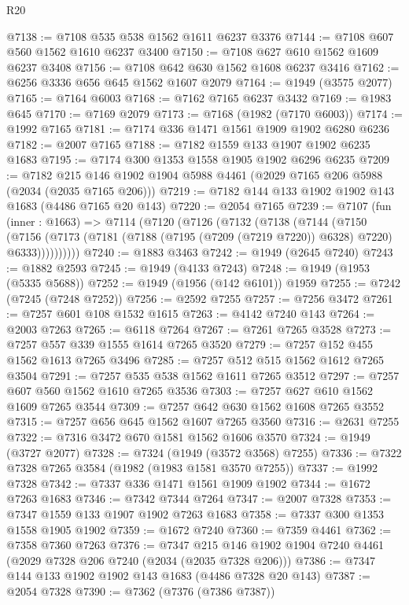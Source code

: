 \begin{lexlean}{R20}
\begin{coremodule}
@7138 := @7108 @535 @538 @1562 @1611 @6237 @3376
@7144 := @7108 @607 @560 @1562 @1610 @6237 @3400
@7150 := @7108 @627 @610 @1562 @1609 @6237 @3408
@7156 := @7108 @642 @630 @1562 @1608 @6237 @3416
@7162 := @6256 @3336 @656 @645 @1562 @1607 @2079
@7164 := @1949 (@3575 @2077)
@7165 := @7164 @6003
@7168 := @7162 @7165 @6237 @3432
@7169 := @1983 @645
@7170 := @7169 @2079
@7173 := @7168 (@1982 (@7170 @6003))
@7174 := @1992 @7165
@7181 := @7174 @336 @1471 @1561 @1909 @1902 @6280 @6236
@7182 := @2007 @7165
@7188 := @7182 @1559 @133 @1907 @1902 @6235 @1683
@7195 := @7174 @300 @1353 @1558 @1905 @1902 @6296 @6235
@7209 := @7182 @215 @146 @1902 @1904 @5988 @4461 (@2029 @7165 @206 @5988 (@2034 (@2035 @7165 @206)))
@7219 := @7182 @144 @133 @1902 @1902 @143 @1683 (@4486 @7165 @20 @143)
@7220 := @2054 @7165
@7239 := @7107
    (fun (inner : @1663) =>
    @7114
      (@7120
        (@7126
          (@7132
            (@7138
              (@7144
                (@7150
                  (@7156
                    (@7173 (@7181 (@7188 (@7195 (@7209 (@7219 @7220)) @6328) @7220) @6333))))))))))
@7240 := @1883 @3463
@7242 := @1949 (@2645 @7240)
@7243 := @1882 @2593
@7245 := @1949 (@4133 @7243)
@7248 := @1949 (@1953 (@5335 @5688))
@7252 := @1949 (@1956 (@142 @6101)) @1959
@7255 := @7242 (@7245 (@7248 @7252))
@7256 := @2592 @7255
@7257 := @7256 @3472
@7261 := @7257 @601 @108 @1532 @1615
@7263 := @4142 @7240 @143
@7264 := @2003 @7263
@7265 := @6118 @7264
@7267 := @7261 @7265 @3528
@7273 := @7257 @557 @339 @1555 @1614 @7265 @3520
@7279 := @7257 @152 @455 @1562 @1613 @7265 @3496
@7285 := @7257 @512 @515 @1562 @1612 @7265 @3504
@7291 := @7257 @535 @538 @1562 @1611 @7265 @3512
@7297 := @7257 @607 @560 @1562 @1610 @7265 @3536
@7303 := @7257 @627 @610 @1562 @1609 @7265 @3544
@7309 := @7257 @642 @630 @1562 @1608 @7265 @3552
@7315 := @7257 @656 @645 @1562 @1607 @7265 @3560
@7316 := @2631 @7255
@7322 := @7316 @3472 @670 @1581 @1562 @1606 @3570
@7324 := @1949 (@3727 @2077)
@7328 := @7324 (@1949 (@3572 @3568) @7255)
@7336 := @7322 @7328 @7265 @3584 (@1982 (@1983 @1581 @3570 @7255))
@7337 := @1992 @7328
@7342 := @7337 @336 @1471 @1561 @1909 @1902
@7344 := @1672 @7263 @1683
@7346 := @7342 @7344 @7264
@7347 := @2007 @7328
@7353 := @7347 @1559 @133 @1907 @1902 @7263 @1683
@7358 := @7337 @300 @1353 @1558 @1905 @1902
@7359 := @1672 @7240
@7360 := @7359 @4461
@7362 := @7358 @7360 @7263
@7376 := @7347 @215 @146 @1902 @1904 @7240 @4461 (@2029 @7328 @206 @7240 (@2034 (@2035 @7328 @206)))
@7386 := @7347 @144 @133 @1902 @1902 @143 @1683 (@4486 @7328 @20 @143)
@7387 := @2054 @7328
@7390 := @7362 (@7376 (@7386 @7387))

\end{coremodule}
\end{lexlean}
